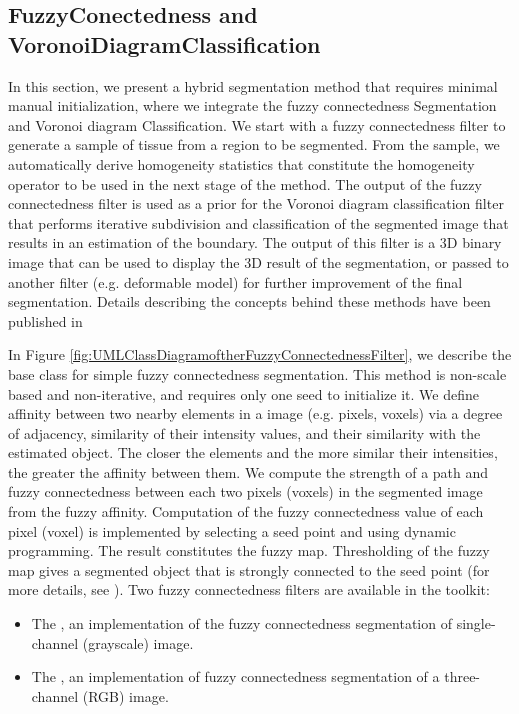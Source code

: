 \subsection{FuzzyConectedness and VoronoiDiagramClassification}
\label{sec:HybridMethod1}
 In this section, we present a hybrid segmentation method that
requires minimal manual initialization, where we integrate the fuzzy
connectedness Segmentation and Voronoi diagram Classification. We
start with a fuzzy connectedness filter to generate a sample of
tissue from a region to be segmented. From the sample, we
automatically derive homogeneity statistics that constitute the
homogeneity operator to be used in the next stage of the method. The
output of the fuzzy  connectedness filter is used as a prior for the
Voronoi diagram classification  filter that performs iterative
subdivision and classification of the segmented image that results in
an estimation of the boundary. The output of this filter is a 3D
binary image that can be used to display the 3D result of the
segmentation, or passed to another filter (e.g. deformable model) for
further improvement of the final segmentation. Details describing the
concepts behind these methods  have been published in
\cite{Angelini2002,Udupa2002,Jin2002,Imielinska2001,Imielinska2000a,Imielinska2000b}

In Figure \ref{fig:UMLClassDiagramoftherFuzzyConnectednessFilter}, we describe 
the base class for simple fuzzy connectedness segmentation. This method is non-scale 
based and non-iterative, and requires only one seed to initialize it. We define affinity 
between two nearby elements in a image (e.g. pixels, voxels) via a degree of adjacency, 
similarity of their intensity values, and their similarity with the estimated object. 
The closer the elements and the more similar their intensities, the greater the affinity between them. We compute the strength of a path and fuzzy connectedness 
between each two pixels (voxels) in the segmented image from the fuzzy affinity. 
Computation of the fuzzy connectedness value of each pixel (voxel) is implemented
by selecting a seed point and using dynamic programming. The result constitutes the fuzzy
map. Thresholding of the fuzzy map gives a segmented object that is strongly connected
to the seed point (for more details, see \cite{Udupa1996}). Two fuzzy
connectedness filters are available in the toolkit: 

\begin{itemize}
\item The , an implementation of the
fuzzy connectedness segmentation of single-channel (grayscale) image.
\item The , an implementation
of fuzzy connectedness segmentation of a three-channel (RGB) image. 
\end{itemize}

